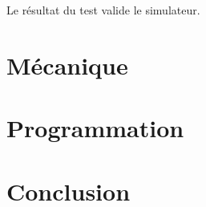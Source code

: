 \documentclass[a4paper,10pt]{article}
\begin{document}
Le résultat du test valide le simulateur.

\section{Mécanique}



\section{Programmation}


\section{Conclusion}
\end{document}

